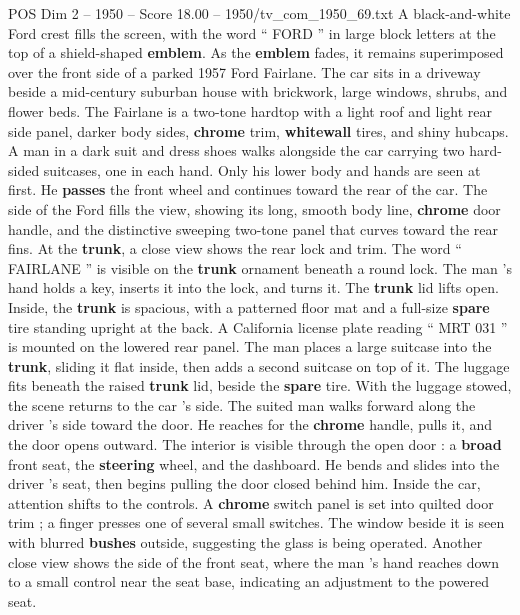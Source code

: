 \begin{textsample}{POS Dim 2 – 1950 – Score 18.00 – 1950/tv\_com\_1950\_69.txt}  \label{ex:f2_pos_081}
A black-and-white Ford crest fills the screen, with the word “ FORD ” in large block letters at the top of a shield-shaped \textbf{emblem}.
As the \textbf{emblem} fades, it remains superimposed over the front side of a parked 1957 Ford Fairlane.
The car sits in a driveway beside a mid-century suburban house with brickwork, large windows, shrubs, and flower beds.
The Fairlane is a two-tone hardtop with a light roof and light rear side panel, darker body sides, \textbf{chrome} trim, \textbf{whitewall} tires, and shiny hubcaps.
A man in a dark suit and dress shoes walks alongside the car carrying two hard-sided suitcases, one in each hand.
Only his lower body and hands are seen at first.
He \textbf{passes} the front wheel and continues toward the rear of the car.
The side of the Ford fills the view, showing its long, smooth body line, \textbf{chrome} door handle, and the distinctive sweeping two-tone panel that curves toward the rear fins.
At the \textbf{trunk}, a close view shows the rear lock and trim.
The word “ FAIRLANE ” is visible on the \textbf{trunk} ornament beneath a round lock.
The man ’s hand holds a key, inserts it into the lock, and turns it.
The \textbf{trunk} lid lifts open.
Inside, the \textbf{trunk} is spacious, with a patterned floor mat and a full-size \textbf{spare} tire standing upright at the back.
A California license plate reading “ MRT 031 ” is mounted on the lowered rear panel.
The man places a large suitcase into the \textbf{trunk}, sliding it flat inside, then adds a second suitcase on top of it.
The luggage fits beneath the raised \textbf{trunk} lid, beside the \textbf{spare} tire.
With the luggage stowed, the scene returns to the car ’s side.
The suited man walks forward along the driver ’s side toward the door.
He reaches for the \textbf{chrome} handle, pulls it, and the door opens outward.
The interior is visible through the open door : a \textbf{broad} front seat, the \textbf{steering} wheel, and the dashboard.
He bends and slides into the driver ’s seat, then begins pulling the door closed behind him.
Inside the car, attention shifts to the controls.
A \textbf{chrome} switch panel is set into quilted door trim ; a finger presses one of several small switches.
The window beside it is seen with blurred \textbf{bushes} outside, suggesting the glass is being operated.
Another close view shows the side of the front seat, where the man ’s hand reaches down to a small control near the seat base, indicating an adjustment to the powered seat.

\end{textsample}
